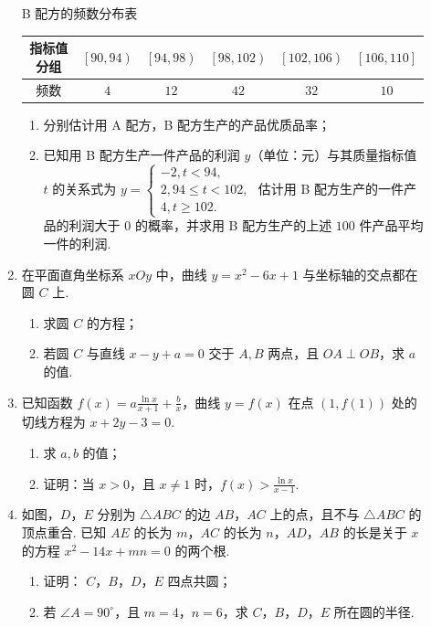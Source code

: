 \begin{description}
\begin{enumerate}[leftmargin=5pt]
\begin{center}
B 配方的频数分布表

\begin{tabular}{c|ccccc}
\hline
指标值分组 & \(\left[90,94\right)\) & \(\left[94,98\right)\) & \(\left[98,102\right)\) & \(\left[102,106\right)\) & \(\left[106,110\right]\) \\
\hline
频数 & \(4\) & \(12\) & \(42\) & \(32\) & \(10\) \\
\hline
\end{tabular}
\end{center}

\begin{enumerate}
\item 分别估计用 A 配方，B 配方生产的产品优质品率；
\item 已知用 B 配方生产一件产品的利润 \(y\)（单位：元）与其质量指标值 \(t\) 的关系式为 \(y = \begin{cases}
-2,  t < 94,\\
2,  94 \leqslant t < 102,\\
4,  t \geqslant 102.
\end{cases}\)
估计用 B 配方生产的一件产品的利润大于 \(0\) 的概率，并求用 B 配方生产的上述 \(100\) 件产品平均一件的利润.
\end{enumerate}

        \item 在平面直角坐标系 \(xOy\) 中，曲线 \(y = x^{2} - 6x + 1\) 与坐标轴的交点都在圆 \(C\) 上.
\begin{enumerate}
\item 求圆 \(C\) 的方程；
\item 若圆 \(C\) 与直线 \(x - y + a = 0\) 交于 \(A, B\) 两点，且 \(OA \perp OB\)，求 \(a\) 的值.
\end{enumerate}

        \item 已知函数 \( f(x) = a \frac{\ln x}{x + 1} + \frac{b}{x} \)，曲线 \( y = f(x) \) 在点 \((1, f(1))\) 处的切线方程为 \( x + 2y - 3 = 0 \).
\begin{enumerate}
\item 求 \(a, b\) 的值；
\item 证明：当 \(x > 0\)，且 \(x \neq 1\) 时，\(f(x) > \frac{\ln x}{x - 1}\).
\end{enumerate}

        \item 如图，\(D\)，\(E\) 分别为 \(\triangle ABC\) 的边 \(AB\)，\(AC\) 上的点，且不与 \(\triangle ABC\) 的顶点重合.
已知 \(AE\) 的长为 \(m\)，\(AC\) 的长为 \(n\)，\(AD\)，\(AB\) 的长是关于 \(x\) 的方程 \(x^{2} - 14x + mn = 0\) 的两个根.
\begin{enumerate}
\item 证明： \(C\)，\(B\)，\(D\)，\(E\) 四点共圆；
\item 若 \(\angle A = 90^{\circ}\)，且 \(m = 4\)，\(n = 6\)，求 \(C\)，\(B\)，\(D\)，\(E\) 所在圆的半径.
\end{enumerate}


\end{enumerate}
\end{description}
